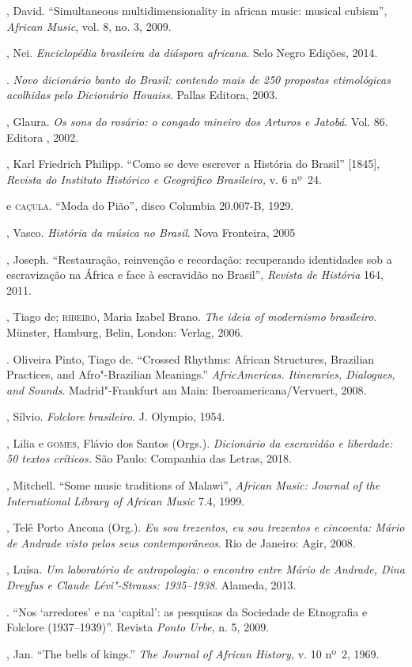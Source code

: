 \begin{bibliohedra}
, David. ``Simultaneous multidimensionality in african music:
musical cubism'', \emph{African Music}, vol. 8, no. 3, 2009.

, Nei. \emph{Enciclopédia brasileira da diáspora africana}. Selo
Negro Edições, 2014.

\titidem. \emph{Novo dicionário banto do Brasil:
contendo mais de 250 propostas etimológicas acolhidas pelo Dicionário
Houaiss}. Pallas Editora, 2003.

, Glaura. \emph{Os sons do rosário: o congado mineiro dos Arturos e
Jatobá}. Vol. 86. Editora , 2002.

, Karl Friedrich Philipp. ``Como se deve escrever a História do
Brasil'' {[}1845{]}, \emph{Revista do Instituto Histórico e Geográfico
Brasileiro,} v. 6 nº~24.

 e \textsc{caçula}. ``Moda do Pião'', disco Columbia 20.007-B, 1929.

, Vasco. \emph{História da música no Brasil}. Nova Fronteira, 2005

, Joseph. ``Restauração, reinvenção e recordação: recuperando
identidades sob a escravização na África e face à escravidão no
Brasil'', \emph{Revista de História} 164, 2011.

, Tiago de; \textsc{ribeiro}, Maria Izabel Brano. \emph{The ideia
of modernismo brasileiro.} Münster, Hamburg, Belin, London:  Verlag,
2006.

\titidem. Oliveira Pinto, Tiago de. ``Crossed Rhythms: African
Structures, Brazilian Practices, and Afro"-Brazilian Meanings.''
\emph{AfricAmericas. Itineraries, Dialogues, and Sounds}.
Madrid"-Frankfurt am Main: Iberoamericana/Vervuert, 2008.

, Sílvio. \emph{Folclore brasileiro}. J. Olympio, 1954.

, Lilia e \textsc{gomes}, Flávio dos Santos (Orgs.). \emph{Dicionário da escravidão e liberdade: 50 textos críticos.} São Paulo: Companhia das
Letras, 2018.

, Mitchell. ``Some music traditions of Malawi'', \emph{African
Music: Journal of the International Library of African Music} 7.4, 1999.

, Telê Porto Ancona (Org.). \emph{Eu sou trezentos, eu sou
trezentos e cincoenta: Mário de Andrade visto pelos seus
contemporâneos}. Rio de Janeiro: Agir, 2008.

, Luísa. \emph{Um laboratório de antropologia: o encontro entre
Mário de Andrade, Dina Dreyfus e Claude Lévi"-Strauss: 1935--1938}.
Alameda, 2013.

\titidem. ``Nos `arredores' e na `capital': as pesquisas da
Sociedade de Etnografia e Folclore (1937--1939)''. Revista \emph{Ponto
Urbe}, n. 5, 2009.

, Jan. ``The bells of kings.'' \emph{The Journal of African
History,} v. 10 nº~2, 1969.
\end{bibliohedra}

